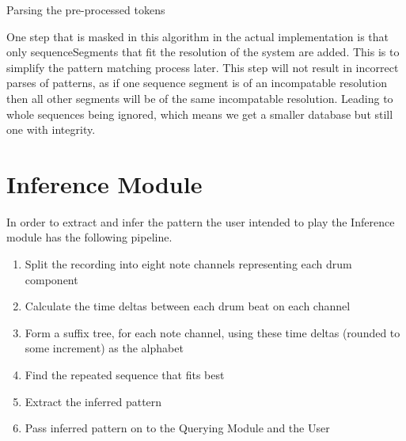 \documentclass[12pt,twoside,notitlepage]{report}
\begin{document}
				\begin{algorithm}
				\caption{Parsing the pre-processed tokens}
				\label{algo:Parse}
				\begin{algorithmic}[1]
								\EndFor
							\EndFor
						\EndFor
						
					

					\EndProcedure
				\end{algorithmic}
				\end{algorithm}
				
				One step that is masked in this algorithm in the actual implementation is that only sequenceSegments that fit the resolution of the system are added. This is to simplify the pattern matching process later. This step will not result in incorrect parses of patterns, as if one sequence segment is of an incompatable resolution then all other segments will be of the same incompatable resolution. Leading to whole sequences being ignored, which means we get a smaller database but still one with integrity.


	\section{Inference Module}\label{sec:Inference Module}

	In order to extract and infer the pattern the user intended to play the Inference module has the following pipeline.

	\begin{enumerate}
	
		\item{Split the recording into eight note channels representing each drum component}
		\item{Calculate the time deltas between each drum beat on each channel}
		\item{Form a suffix tree, for each note channel, using these time deltas (rounded to some increment) as the alphabet}
		\item{Find the repeated sequence that fits best}
		\item{Extract the inferred pattern}
		\item{Pass inferred pattern on to the Querying Module and the User}
	\end{enumerate}
	
\end{document}
